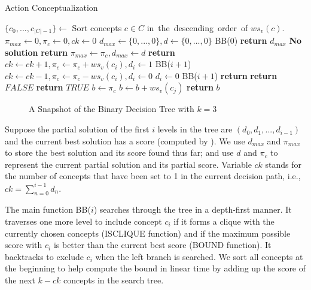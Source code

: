 \begin{algorithm}[th]
\small
\caption{Action Conceptualization}
\label{al:backtrack}
\begin{algorithmic}[1]
\State $\{c_0,...,c_{|C|-1}\}\leftarrow$ Sort concepts $c\in C$ in\ the\ descending\ order\ of $ws_v(c)$.
\State $\pi_{max} \leftarrow 0,\pi_{c} \leftarrow 0,ck \leftarrow 0$
\State $d_{max}\leftarrow\{0,...,0\},d\leftarrow\{0,...,0\}$
\State BB($0$)
\State \textbf{return} $d_{max}$
\Else
\State \textbf{No solution}
\EndIf
\EndFunction
\Statex
{}
\State \textbf{return}
\EndIf
{}
\State $\pi_{max} \leftarrow \pi_{c}, d_{max} \leftarrow d$
\EndIf
\State \textbf{return}
\EndIf
{}
\State $ck \leftarrow ck+1, \pi_{c} \leftarrow \pi_{c}+ws_v(c_i), d_i \leftarrow 1$
\State BB($i+1$)
\State $ck \leftarrow ck-1, \pi_{c} \leftarrow \pi_{c}-ws_v(c_i), d_i \leftarrow 0$
\EndIf
{}
\State $d_i \leftarrow 0$
\State BB($i+1$)
\EndIf
\State \textbf{return}
\EndFunction
\Statex
{}
\State \textbf{return} $FALSE$
\EndIf
\EndIf
\EndFor
\State \textbf{return} $TRUE$
\EndFunction
\Statex
{}
\State $b \leftarrow \pi_{c}$
\State $b \leftarrow b+ws_v(c_{j})$
\EndFor
\State \textbf{return} $b$
\EndFunction
\end{algorithmic}
\end{algorithm}


\begin{figure}[th]
\centering
{}
\caption{A Snapshot of the Binary Decision Tree with $k=3$}
\label{fig:search_tree}
\end{figure}

Suppose the partial solution of the first $i$ levels in the tree
are $(d_0, d_1, ..., d_{i-1})$ and
the current best solution has a score (computed by ).
We use $d_{max}$ and $\pi_{max}$ to store the
best solution and its score found thus far; and use $d$ and $\pi_{c}$ to
represent the current partial solution and its partial score.
Variable $ck$ stands for the number of concepts that have been set to
1 in the current decision path, i.e.,
$ck=\sum_{n=0}^{i-1}d_n.$

The main function BB($i$) searches through the tree in a depth-first manner.
It traverses one
more level to include concept $c_i$ if it forms
a clique with the currently chosen concepts (ISCLIQUE function)
and if the maximum possible score with $c_i$ is better than
the current best score (BOUND function). It backtracks to exclude $c_i$
when the left branch is searched.
We sort all concepts at the beginning to help compute
the bound in linear time by adding up the score of the
next $k-ck$ concepts in the search tree.

